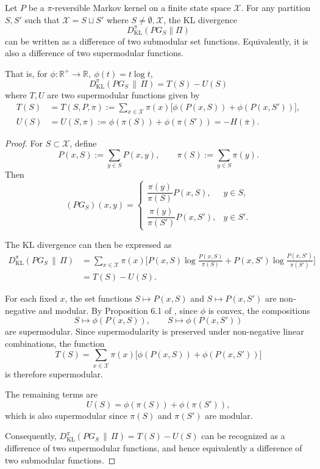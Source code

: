 \documentclass[EJP]{ejpecp} %
\begin{document}
\begin{proposition}\label{prop:DPGdiffsub}
    Let $P$ be a $\pi$-reversible Markov kernel on a finite state space $\mathcal X$. 
    For any partition $S,S'$ such that $\mathcal{X} = S \sqcup S'$ where $S \neq \emptyset,\mathcal{X}$, the KL divergence
    $$D_{\mathrm{KL}}^\pi(PG_S \| \Pi)$$
    can be written as a difference of two submodular set functions. Equivalently, it is also a difference of two supermodular functions. 

    That is, for $\phi : \mathbb R^+ \to \mathbb R,\ \phi(t) = t \log t$,
    $$D_{\mathrm{KL}}^\pi(PG_S \,\|\, \Pi) = T(S) - U(S)$$ 
    where $T, U$ are two supermodular functions given by
    \begin{align*}
        T(S) &= T(S,P,\pi) := \sum_{x \in \mathcal X} \pi(x)\big[\phi(P(x,S)) + \phi(P(x,S'))\big],\\
        U(S) &= U(S,\pi) := \phi(\pi(S)) + \phi(\pi(S')) = -H(\overline{\pi}).
    \end{align*}
\end{proposition}

\begin{proof}
    For $S \subset \mathcal X$, define
    $$P(x,S) := \sum_{y \in S} P(x,y), \qquad \pi(S) := \sum_{y \in S} \pi(y).$$
    Then
    $$(PG_S)(x,y) = 
        \begin{cases}
            \dfrac{\pi(y)}{\pi(S)} P(x,S), & y \in S, \\[6pt]
            \dfrac{\pi(y)}{\pi(S')} P(x,S'), & y \in S' .
        \end{cases}$$

    The KL divergence can then be expressed as
    \begin{align*}
        D_{\mathrm{KL}}^\pi(PG_S \,\|\, \Pi) &= \sum_{x \in \mathcal X} \pi(x) \Bigg[P(x,S) \log \frac{P(x,S)}{\pi(S)} + P(x,S') \log \frac{P(x,S')}{\pi(S')}\Bigg] \\
        &= T(S) - U(S).
    \end{align*}

    For each fixed $x$, the set functions $S \mapsto P(x,S)$ and $S \mapsto P(x,S')$ are non-negative and modular. By Proposition 6.1 of \cite{bach2013learningsubmodularfunctionsconvex}, since $\phi$ is convex, the compositions
    $$S \mapsto \phi(P(x,S)),
        \qquad
        S \mapsto \phi(P(x,S'))$$
    are supermodular. Since supermodularity is preserved under non-negative linear combinations, the function
    $$T(S) = \sum_{x \in \mathcal X} \pi(x)\big[\phi(P(x,S)) + \phi(P(x,S'))\big]$$
    is therefore supermodular.

    The remaining terms are
    $$U(S) = \phi(\pi(S)) + \phi(\pi(S')),$$
    which is also supermodular since $\pi(S)$ and $\pi(S')$ are modular.

    Consequently, $D_{\mathrm{KL}}^\pi(PG_S \,\|\, \Pi) = T(S) - U(S)$ can be recognized as a difference of two supermodular functions, and hence equivalently a difference of two submodular functions.
\end{proof}
\end{document}

